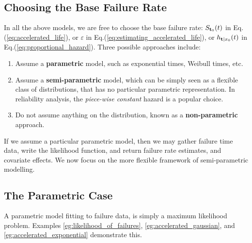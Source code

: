 \subsection{Choosing the Base Failure Rate}
In all the above models, we are free to choose the base failure rate: 
$S_{\mathbf{t}_0} (t)$ in Eq.(\ref{eq:accelerated_life}), or
$\varepsilon$ in Eq.(\ref{eq:estimating_accelerated_life}), or 
$h_{\mathbf{t}|x_0} (t)$ in Eq.(\ref{eq:proportional_hazard}).
Three possible approaches include:
\begin{enumerate}
\item Assume a \textbf{parametric} model, such as exponential times, Weibull times, etc.
\item Assume a \textbf{semi-parametric} model, which can be simply seen as a flexible class of distributions, that has no particular parametric representation. In reliability analysis, the \emph{piece-wise constant} hazard is a popular choice.
\item Do not assume anything on the distribution, known as a \textbf{non-parametric} approach. 
\end{enumerate}
If we assume a particular parametric model, then we may gather failure time data, write the likelihood function, and return failure rate estimates, and covariate effects.
We now focus on the more flexible framework of semi-parametric modelling.


\subsection{The Parametric Case}
A parametric model fitting to failure data, is simply a maximum likelihood problem.
Examples \ref{eg:likelihood_of_failures}, \ref{eg:accelerated_gaussian}, and \ref{eg:accelerated_exponential} demonstrate this. 




